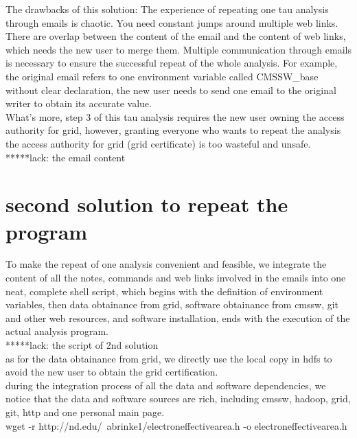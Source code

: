 \documentclass{article}
\begin{document}
The drawbacks of this solution: The experience of repeating one tau analysis through emails is chaotic. You need constant jumps around multiple web links. There are overlap between the content of the email and the content of web links, which needs the new user to merge them. Multiple communication through emails is necessary to ensure the successful repeat of the whole analysis. For example, the original email refers to one environment variable called CMSSW\_base without clear declaration, the new user needs to send one email to the original writer to obtain its accurate value.\\

What’s more, step 3 of this tau analysis requires the new user owning the access authority for grid, however, granting  everyone who wants to repeat the analysis the access authority for grid (grid certificate) is too wasteful and unsafe. \\

*****lack: the email content

\section{second solution to repeat the program}
\indent To make the repeat of one analysis convenient and feasible, we integrate the content of all the notes, commands and web links involved in the emails into one neat, complete shell script, which begins with the definition of environment variables, then data obtainance from grid, software obtainance from cmssw, git and other web resources, and software installation, ends with the execution of the actual analysis program.\\

*****lack: the script of 2nd solution \\

as for the data obtainance from grid, we directly use the local copy in hdfs to avoid the new user to obtain the grid certification.\\

during the integration process of all the data and software dependencies, we notice that the data and software sources are rich, including cmssw, hadoop, grid, git, http and one personal main page. \\
\indent wget -r http://nd.edu/~abrinke1/electroneffectivearea.h -o electroneffectivearea.h\\ 
\end{document}

